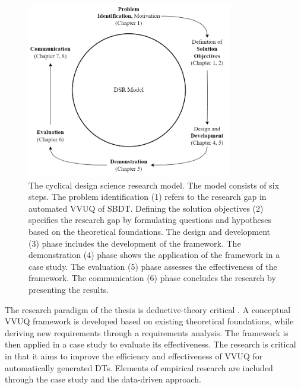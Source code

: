 \begin{figure}[htbp]
  \centering
  \includegraphics[width=0.8\textwidth]{figures/dsr.png}
  \caption{The cyclical design science research model. The model consists of six steps. The problem identification (1) refers to the research gap in automated VVUQ of SBDT. Defining the solution objectives (2) specifies the research gap by formulating questions and hypotheses based on the theoretical foundations. The design and development (3) phase includes the development of the framework. The demonstration (4) phase shows the application of the framework in a case study. The evaluation (5) phase assesses the effectiveness of the framework. The communication (6) phase concludes the research by presenting the results.}
  \label{fig:DSR}
\end{figure}

The research paradigm of the thesis is deductive-theory critical \parencite{eberhard1987einfuhrung}. A conceptual VVUQ framework is developed based on existing theoretical foundations, while deriving new requirements through a requirements analysis. The framework is then applied in a case study to evaluate its effectiveness. The research is critical in that it aims to improve the efficiency and effectiveness of VVUQ for automatically generated DTs. Elements of empirical research are included through the case study and the data-driven approach.

